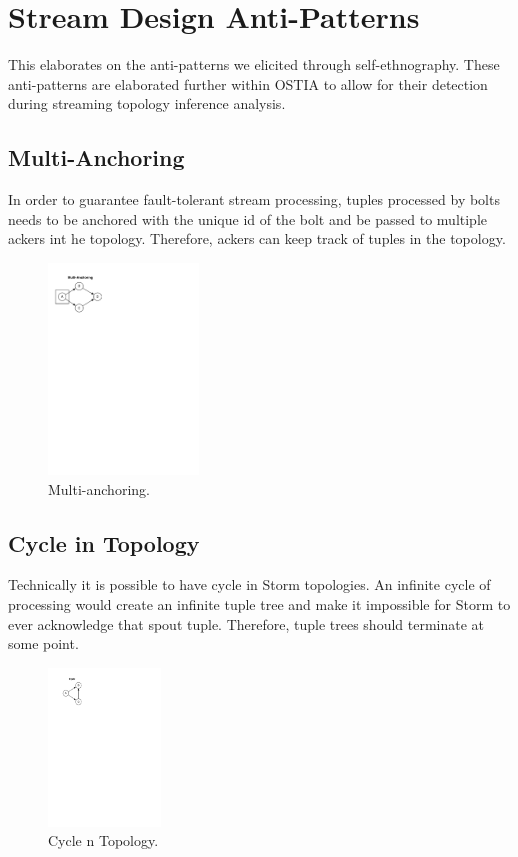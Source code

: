 \section{Stream Design Anti-Patterns}
\label{sec:anti-pattern}
This elaborates on the anti-patterns we elicited through self-ethnography. These anti-patterns are elaborated further within OSTIA to allow for their detection during streaming topology inference analysis.

\subsection{Multi-Anchoring}
In order to guarantee fault-tolerant stream processing, tuples processed by bolts needs to be anchored with the unique id of the bolt and be passed to multiple ackers int he topology. Therefore, ackers can keep track of tuples in the topology.

\begin{figure}[H]
	\begin{center}
		\includegraphics[width=4cm]{images/multi-anchoring}
		\caption{Multi-anchoring.}
		\label{fig:multi-anchoring}
	\end{center}
\end{figure}

\subsection{Cycle in Topology}

Technically it is possible to have cycle in Storm topologies. An infinite cycle of processing would create an infinite tuple tree and make it impossible for Storm to ever acknowledge that spout tuple. Therefore,  tuple trees should terminate at some point.

\begin{figure}[H]
	\begin{center}
		\includegraphics[width=3cm]{images/cycle}
		\caption{Cycle n Topology.}
		\label{fig:cycle}
	\end{center}
\end{figure}

